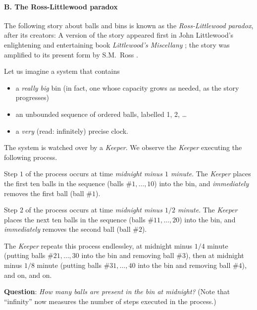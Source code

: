 \paragraph{\small\sf B. The Ross-Littlewood paradox}

The following story about balls and bins is known as the {\it
  Ross-Littlewood paradox}, after its creators: A version of the story
appeared first in John Littlewood's enlightening and entertaining book
{\it Littlewood's Miscellany} \cite{Littlewood-misc};
 the story was amplified to its present
form by S.M.~Ross \cite{Ross76}. 

Let us imagine a system that contains
\begin{itemize}
\item
a {\em really big} bin (in fact, one whose capacity grows as needed,
as the story progresses)
\item
an unbounded sequence of ordered balls, labelled 1, 2, \ldots
\item
a {\em very} (read: infinitely) precise clock.
\end{itemize}
The system is watched over by a {\it Keeper}.  We observe
the {\it Keeper} executing the following process.

Step $1$ of the process occurs at time {\em midnight minus $1$
  minute}.  The {\it Keeper} places the first ten balls in the
sequence (balls \#$1, \ldots, 10$) into the bin, and {\em immediately}
removes the first ball (ball \#$1$).

Step $2$ of the process occurs at time {\em midnight minus $1/2$
  minute}.  The {\it Keeper} places the next ten balls in the sequence
(balls \#$11, \ldots, 20$) into the bin, and {\em immediately} removes
the second ball (ball \#$2$).

The {\it Keeper} repeats this process endlessley, at midnight minus
$1/4$ minute (putting balls \#$21, \ldots, 30$ into the bin and
removing ball \#$3$), then at midnight minus $1/8$ minute (putting
balls \#$31, \ldots, 40$ into the bin and removing ball \#$4$), and
on, and on.

\noindent
{\bf Question}: {\it How many balls are present in the bin at
  midnight?}  (Note that ``infinity'' now measures the number of steps
executed in the process.)

